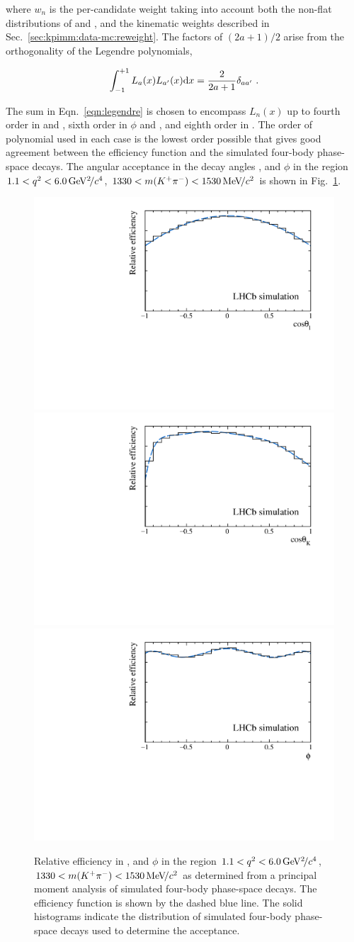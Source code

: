 \noindent where $w_{n}$ is the per-candidate weight taking into account both the non-flat distributions of \qsq and \mkpi, and the kinematic weights described in Sec.~\ref{sec:kpimm:data-mc:reweight}. The factors of $(2a + 1)/2$ arise from the orthogonality of the Legendre polynomials,
 
\begin{equation}
\int_{-1}^{+1} L_{a}(x) L_{a'}(x) \mathrm{d} x = \frac{2}{2 a + 1}\delta_{ a a'}  ~.
\end{equation}

 The sum in Eqn.~\ref{eqn:legendre} is chosen to encompass $L_n(x)$ up to fourth order in \ctl and \mkpi, sixth order in $\phi$ and \qsq, and eighth order in \ctk. The order of polynomial used in each case is the lowest order possible that gives good agreement between the efficiency function and the simulated four-body \BdToKpimm phase-space decays. The angular acceptance in the decay angles \ctl, \ctk and $\phi$ in the region $1.1<{q^2}<6.0{\mathrm{\,Ge\kern -0.1em V^2\!/}c^4}$, $1330<m({{K}^+}{{\pi}^-})<1530{\mathrm{\,Me\kern -0.1em V\!/}c^2}$ is shown in Fig.~\ref{fig:acceptance}.

\begin{figure}[!htb]
  \centering
  \includegraphics[width=0.49\linewidth]{figs/kpimm/acceptance/ctl.pdf}
  \includegraphics[width=0.49\linewidth]{figs/kpimm/acceptance/ctk.pdf}\\
  \includegraphics[width=0.5\linewidth]{figs/kpimm/acceptance/phi.pdf}
  \caption{Relative efficiency in \ctl, \ctk and $\phi$ in the region $1.1<{q^2}<6.0{\mathrm{\,Ge\kern -0.1em V^2\!/}c^4}$, $1330<m({{K}^+}{{\pi}^-})<1530{\mathrm{\,Me\kern -0.1em V\!/}c^2}$ as determined from a principal moment analysis of simulated four-body \BdToKpimm phase-space decays. The efficiency function is shown by the dashed blue line.  The solid histograms indicate the distribution of simulated four-body \BdToKpimm phase-space decays used to determine the acceptance.}
\label{fig:acceptance}
\end{figure}
